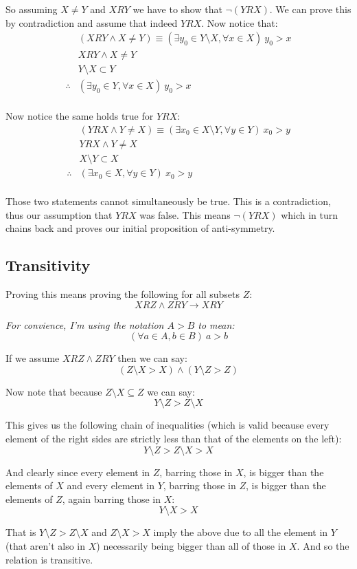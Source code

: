 \documentclass{article}
\begin{document}
So assuming $X\not=Y$ and $XRY$ we have to show that $\neg(YRX)$. We can prove this by contradiction and assume that indeed $YRX$. Now notice that:
\begin{align*}
&(XRY\wedge X\not=Y)\equiv(\exists y_0\in Y\setminus X,\forall x\in X)\ y_0>x\\
&XRY\wedge X\not=Y\\
&Y\setminus X\subset Y\\
\therefore&(\exists y_0\in Y,\forall x\in X)\ y_0>x\\
\end{align*}

Now notice the same holds true for $YRX$:
\begin{align*}
&(YRX\wedge Y\not=X)\equiv(\exists x_0\in X\setminus Y,\forall y\in Y)\ x_0>y\\
&YRX\wedge Y\not=X\\
&X\setminus Y\subset X\\
\therefore&(\exists x_0\in X,\forall y\in Y)\ x_0>y\\
\end{align*}

Those two statements cannot simultaneously be true. This is a contradiction, thus our assumption that $YRX$ was false. This means $\neg(YRX)$ which in turn chains back and proves our initial proposition of anti-symmetry.

\subsection*{Transitivity}
Proving this means proving the following for all subsets $Z$:
$$XRZ\wedge ZRY\rightarrow XRY$$

\textit{For convience, I'm using the notation $A>B$ to mean:}
$$(\forall a\in A,b\in B)\ a>b$$

If we assume $XRZ\wedge ZRY$ then we can say:
$$(Z\setminus X>X)\wedge(Y\setminus Z>Z)$$

Now note that because $Z\setminus X\subseteq Z$ we can say:
$$Y\setminus Z>Z\setminus X$$

This gives us the following chain of inequalities (which is valid because every element of the right sides are strictly less than that of the elements on the left):
$$Y\setminus Z>Z\setminus X>X$$

And clearly since every element in $Z$, barring those in $X$, is bigger than the elements of $X$ and every element in $Y$, barring those in $Z$, is bigger than the elements of $Z$, again barring those in $X$:
$$Y\setminus X>X$$

That is $Y\setminus Z>Z\setminus X$ and $Z\setminus X>X$ imply the above due to all the element in $Y$ (that aren't also in $X$) necessarily being bigger than all of those in $X$. And so the relation is transitive.
\end{document}
